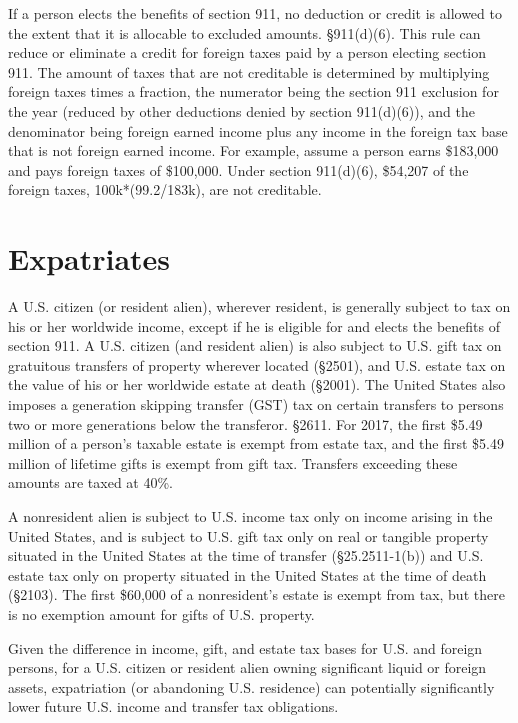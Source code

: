 If a person elects the benefits of section 911, no deduction or credit is allowed to the extent that it is allocable to excluded amounts.  \S911(d)(6).  This rule can reduce or eliminate a credit for foreign taxes paid by a person electing section 911.  The amount of taxes that are not creditable is determined by multiplying foreign taxes times a fraction, the numerator being the section 911 exclusion for the year (reduced by other deductions denied by section 911(d)(6)), and the denominator being foreign earned income plus any income in the foreign tax base that is not foreign earned income.  For example, assume a person earns \$183,000 and pays foreign taxes of \$100,000.  Under section 911(d)(6), \$54,207 of the foreign taxes, 100k*(99.2/183k), are not creditable.
 
\section{Expatriates}
	
	
 A U.S. citizen (or resident alien), wherever resident, is generally subject to tax on his or her worldwide income, except if he is eligible for and elects the benefits of section 911.  A U.S. citizen (and resident alien) is also subject to U.S. gift tax on gratuitous transfers of property wherever located (\S2501), and U.S. estate tax on the value of his or her worldwide estate at death (\S2001).  The United States also imposes a generation skipping transfer (GST) tax on certain transfers to persons two or more generations below the transferor.  \S2611.  For 2017, the first \$5.49 million of a person's taxable estate is exempt from estate tax, and the first \$5.49 million of lifetime gifts is exempt from gift tax.   Transfers exceeding these amounts are taxed at 40\%.     

A nonresident alien is subject to U.S. income tax only on income arising in the United States, and is subject to U.S. gift tax only on real or tangible property situated in the United States at the time of transfer (\S25.2511-1(b)) and U.S. estate tax only on property situated in the United States at the time of death (\S2103).  The first \$60,000 of a nonresident's estate is exempt from tax, but there is no exemption amount for gifts of U.S. property.   

% 
 Given the difference in income, gift, and estate tax bases for U.S. and foreign persons, for a U.S. citizen or resident alien owning significant liquid or foreign assets, expatriation (or abandoning U.S. residence) can potentially significantly lower future U.S. income and transfer tax obligations.  
 
